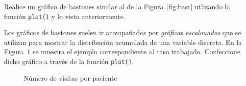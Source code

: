 \documentclass{prob}
\begin{document}
\begin{problema}
	\begin{parte}
	Realice un gráfico de bastones similar al de la Figura~\ref{fig:bast} utlizando la función \texttt{plot()} y lo visto anteriormente. 
	\end{parte}

	\begin{parte}
	Los gráficos de bastones suelen ir acompañados por  \textit{gráficos escalonados} que se utilizan para mostrar la distribución acumulada de una variable discreta. En la Figura~\ref{fig:bast2} se muestra el ejemplo correspondiente al caso trabajado. Confeccione dicho gráfico a través de la función \texttt{plot()}.\\
	
	\noindent{}
	\end{parte}

\begin{figure}[!ht]
    \centering
    
    \caption{Número de visitas por paciente}
    \label{fig:bast2}
\end{figure}	
	
	\end{problema}
	
\end{document}

